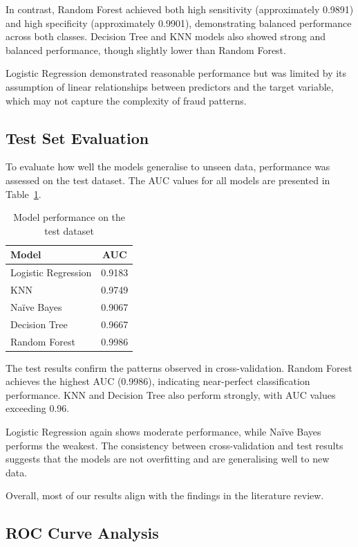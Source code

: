 \documentclass{article}
\begin{document}
In contrast, Random Forest achieved both high sensitivity (approximately 0.9891) and high specificity (approximately 0.9901), demonstrating balanced performance across both classes. Decision Tree and KNN models also showed strong and balanced performance, though slightly lower than Random Forest.

Logistic Regression demonstrated reasonable performance but was limited by its assumption of linear relationships between predictors and the target variable, which may not capture the complexity of fraud patterns.

\subsection{Test Set Evaluation}

To evaluate how well the models generalise to unseen data, performance was assessed on the test dataset. The AUC values for all models are presented in Table~\ref{tab:auc}.

\begin{table}[htbp]
\centering
\begin{tabular}{lc}
\hline
Model & AUC \\
\hline
Logistic Regression & 0.9183 \\
KNN & 0.9749 \\
Naïve Bayes & 0.9067 \\
Decision Tree & 0.9667 \\
Random Forest & 0.9986 \\
\hline
\end{tabular}
\caption{Model performance on the test dataset}
\label{tab:auc}
\end{table}

The test results confirm the patterns observed in cross-validation. Random Forest achieves the highest AUC (0.9986), indicating near-perfect classification performance. KNN and Decision Tree also perform strongly, with AUC values exceeding 0.96.

Logistic Regression again shows moderate performance, while Naïve Bayes performs the weakest. The consistency between cross-validation and test results suggests that the models are not overfitting and are generalising well to new data.

Overall, most of our results align with the findings in the literature review.

\subsection{ROC Curve Analysis}
\end{document}
